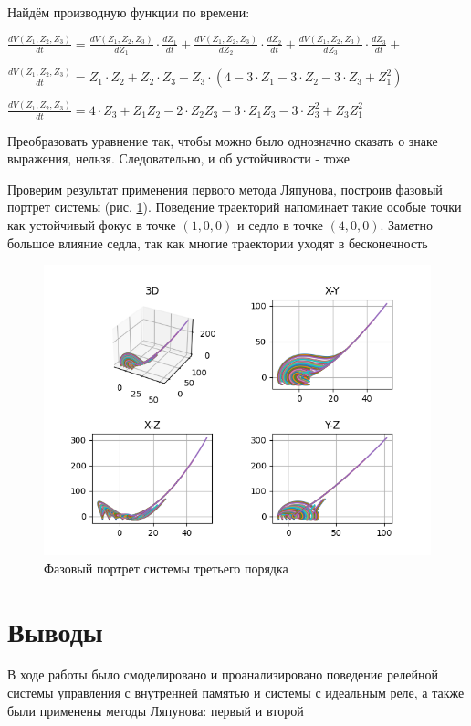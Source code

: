 Найдём производную функции по времени:

$
\frac{dV(Z_1,Z_2,Z_3)}{dt}=
\frac{dV(Z_1,Z_2,Z_3)}{dZ_1} \cdot \frac{dZ_1}{dt} + 
\frac{dV(Z_1,Z_2,Z_3)}{dZ_2} \cdot \frac{dZ_2}{dt} + 
\frac{dV(Z_1,Z_2,Z_3)}{dZ_3} \cdot \frac{dZ_3}{dt} + 
$

$
\frac{dV(Z_1,Z_2,Z_3)}{dt}=Z_1 \cdot Z_2 + Z_2 \cdot Z_3 - Z_3 \cdot (4-3 \cdot Z_1 - 3 \cdot Z_2 - 3 \cdot Z_3 + Z_1^2)
$

$
\frac{dV(Z_1,Z_2,Z_3)}{dt}=4 \cdot Z_3 + Z_1Z_2 - 2 \cdot Z_2Z_3 - 3 \cdot Z_1Z_3 - 3 \cdot Z_3^2 + Z_3Z_1^2
$

Преобразовать уравнение так, чтобы можно было однозначно сказать о знаке выражения, нельзя. Следовательно, и об устойчивости - тоже

Проверим результат применения первого метода Ляпунова, построив фазовый портрет системы (рис. \ref{fig:7}).
Поведение траекторий напоминает такие особые точки как устойчивый фокус в точке $(1, 0, 0)$ и седло в точке $(4, 0, 0)$.
Заметно большое влияние седла, так как многие траектории уходят в бесконечность

\begin{figure}[H]
	\centering
	\includegraphics[width=1.1\linewidth]{body/images/third-order-system.png}
	\caption{Фазовый портрет системы третьего порядка}
	\label{fig:7}
\end{figure}

\newpage

\section{Выводы}

В ходе работы было смоделировано и проанализировано поведение релейной системы управления с внутренней памятью и
системы с идеальным реле, а также были применены методы Ляпунова: первый и второй
